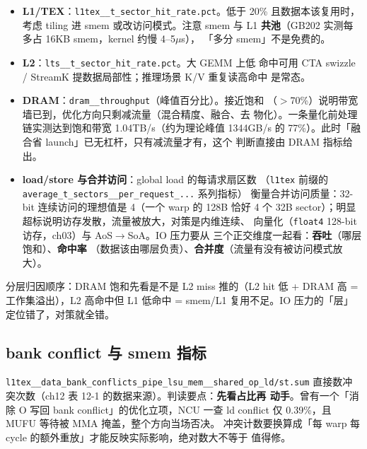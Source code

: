 \begin{itemize}
\item \textbf{L1/TEX}：\texttt{l1tex\_\allowbreak{}\_\allowbreak{}t\_\allowbreak{}sector\_\allowbreak{}hit\_\allowbreak{}rate.pct}。低于
  20\% 且数据本该复用时，考虑 tiling 进 smem 或改访问模式。注意 smem 与 L1
  \textbf{共池}（GB202 实测每多占 16KB smem，kernel 约慢 4--5$\mu$s），
  「多分 smem」不是免费的。
\item \textbf{L2}：\texttt{lts\_\allowbreak{}\_\allowbreak{}t\_\allowbreak{}sector\_\allowbreak{}hit\_\allowbreak{}rate.\allowbreak{}pct}。大 GEMM 上低
  命中可用 CTA swizzle / StreamK 提数据局部性；推理场景 K/V 重复读高命中
  是常态。
\item \textbf{DRAM}：\texttt{dram\_\allowbreak{}\_\allowbreak{}throughput}（峰值百分比）。接近饱和
  （$>$70\%）说明带宽墙已到，优化方向只剩减流量（混合精度、融合、去
  物化）。一条量化前处理链实测达到饱和带宽 1.04TB/s（约为理论峰值
  1344GB/s 的 77\%）。此时「融合省 launch」已无杠杆，只有减流量才有，这个
  判断直接由 DRAM 指标给出。
\item \textbf{load/store 与合并访问}：global load 的每请求扇区数
  （\texttt{l1tex} 前缀的
  \texttt{average\_\allowbreak{}t\_\allowbreak{}sectors\_\allowbreak{}\_\allowbreak{}per\_\allowbreak{}request\_\allowbreak{}\allowbreak{}...} 系列指标）
  衡量合并访问质量：32-bit 连续访问的理想值是 4（一个 warp 的 128B 恰好
  4 个 32B sector）；明显超标说明访存发散，流量被放大，对策是内维连续、
  向量化（\texttt{float4} 128-bit 访存，ch03）与 AoS$\to$SoA。IO 压力要从
  三个正交维度一起看：\textbf{吞吐}（哪层饱和）、\textbf{命中率}
  （数据该由哪层负责）、\textbf{合并度}（流量有没有被访问模式放大）。
\end{itemize}

分层归因顺序：DRAM 饱和先看是不是 L2 miss 推的（L2 hit 低 + DRAM 高 =
工作集溢出），L2 高命中但 L1 低命中 = smem/L1 复用不足。IO 压力的「层」
定位错了，对策就全错。

\subsection{bank conflict 与 smem 指标}

\texttt{l1tex\_\allowbreak{}\_\allowbreak{}data\_\allowbreak{}bank\_\allowbreak{}conflicts\_\allowbreak{}pipe\_\allowbreak{}lsu\_\allowbreak{}mem\_\allowbreak{}\_\allowbreak{}shared\_\allowbreak{}op\_\allowbreak{}ld/\allowbreak{}st.sum}
直接数冲突次数（ch12 表 12-1 的数据来源）。判读要点：\textbf{先看占比再
动手}。曾有一个「消除 O 写回 bank conflict」的优化立项，NCU 一查
ld conflict 仅 0.39\%，且 MUFU 等待被 MMA 掩盖，整个方向当场否决。
冲突计数要换算成「每 warp 每 cycle 的额外重放」才能反映实际影响，绝对数大不等于
值得修。

